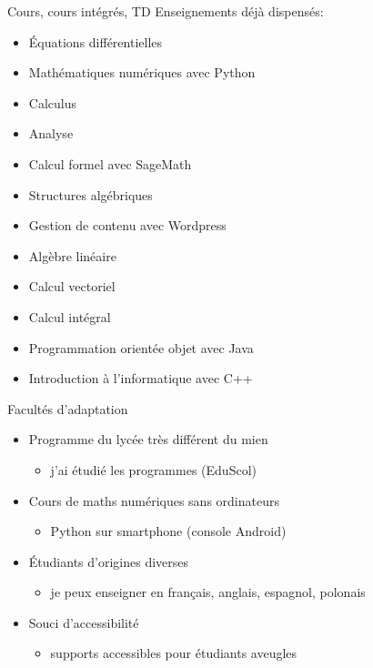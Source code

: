 \documentclass[
  french,
  ignorenonframetext,
]{beamer}
\providecommand{\tightlist}{%
  \setlength{\itemsep}{0pt}\setlength{\parskip}{0pt}}
\begin{document}
\begin{frame}{Cours, cours intégrés, TD}
\protect\hypertarget{cours-cours-intuxe9gruxe9s-td}{}
Enseignements déjà dispensés:

\begin{itemize}
\tightlist
\item
  Équations différentielles
\item
  Mathématiques numériques avec Python
\item
  Calculus
\item
  Analyse
\item
  Calcul formel avec SageMath
\item
  Structures algébriques
\item
  Gestion de contenu avec Wordpress
\item
  Algèbre linéaire
\item
  Calcul vectoriel
\item
  Calcul intégral
\item
  Programmation orientée objet avec Java
\item
  Introduction à l'informatique avec C++
\end{itemize}
\end{frame}

\begin{frame}{Facultés d'adaptation}
\protect\hypertarget{facultuxe9s-dadaptation}{}
\begin{itemize}
\item
  Programme du lycée très différent du mien

  \begin{itemize}
  \tightlist
  \item
    j'ai étudié les programmes (EduScol)
  \end{itemize}
\item
  Cours de maths numériques sans ordinateurs

  \begin{itemize}
  \tightlist
  \item
    Python sur smartphone (console Android)
  \end{itemize}
\item
  Étudiants d'origines diverses

  \begin{itemize}
  \tightlist
  \item
    je peux enseigner en français, anglais, espagnol, polonais
  \end{itemize}
\item
  Souci d'accessibilité

  \begin{itemize}
  \tightlist
  \item
    supports accessibles pour étudiants aveugles
  \end{itemize}
\end{itemize}
\end{frame}
\end{document}
